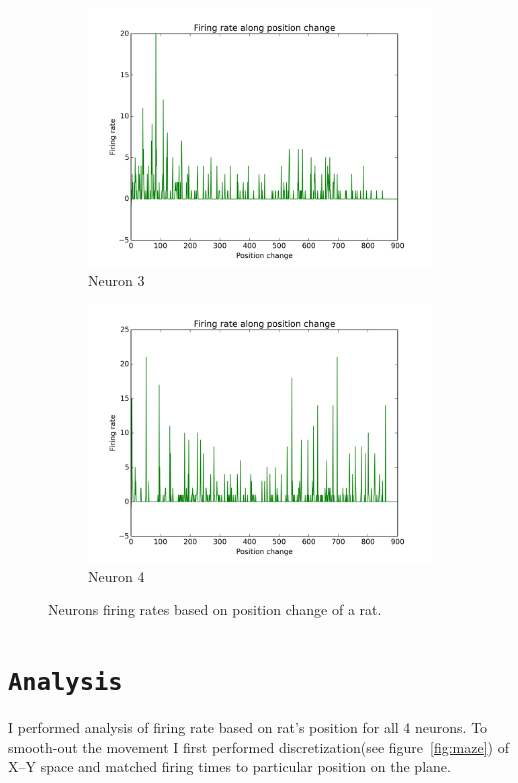 \documentclass[11pt,a4paper,twocolumn]{article}
\begin{document}
\begin{figure}[htbp]
    \begin{subfigure}{.49\linewidth}\centering
    \includegraphics[width=1.1\textwidth]{figure3.png}
    \caption{Neuron 3\label{fig:FiringPosition_N3}}
  \end{subfigure}
  \begin{subfigure}{.49\linewidth}\centering
    \includegraphics[width=1.1\textwidth]{figure4.png}
    \caption{Neuron 4\label{fig:FiringPosition_N4}}
  \end{subfigure}

  \caption{Neurons firing rates based on position change of a rat.\label{fig:FiringPosition_ALL}}
\end{figure}

\section*{\texttt{Analysis}}
I performed analysis of firing rate based on rat's position for all 4 neurons. To smooth-out the movement I first performed discretization(see figure~\ref{fig:maze}) of X--Y space and matched firing times to particular position on the plane.\\
\end{document}
